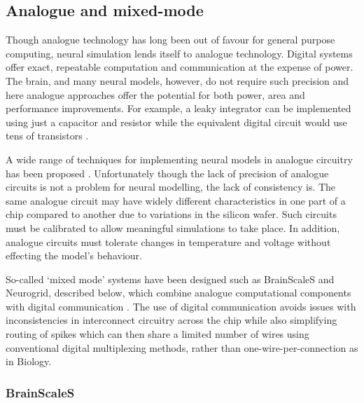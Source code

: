 		\subsection{Analogue and mixed-mode}
			
			Though analogue technology has long been out of favour for general purpose
			computing, neural simulation lends itself to analogue technology.  Digital
			systems offer exact, repeatable computation and communication at the
			expense of power. The brain, and many neural models, however, do not
			require such precision and here analogue approaches offer the potential
			for both power, area and performance improvements. For example, a leaky
			integrator can be implemented using just a capacitor and resistor while
			the equivalent digital circuit would use tens of transistors
			\cite{misra10}.
			
			A wide range of techniques for implementing neural models in analogue
			circuitry has been proposed \cite{graf86,holler89,agranat90,azghadi13}.
			Unfortunately though the lack of precision of analogue circuits is not a
			problem for neural modelling, the lack of consistency is. The same
			analogue circuit may have widely different characteristics in one part of
			a chip compared to another due to variations in the silicon wafer. Such
			circuits must be calibrated to allow meaningful simulations to take place.
			In addition, analogue circuits must tolerate changes in temperature and
			voltage without effecting the model's behaviour.
			
			So-called `mixed mode' systems have been designed such as BrainScaleS and
			Neurogrid, described below, which combine analogue computational
			components with digital communication \cite{maguire07,benjamin14}. The use
			of digital communication avoids issues with inconsistencies in
			interconnect circuitry across the chip while also simplifying routing of
			spikes which can then share a limited number of wires using conventional
			digital multiplexing methods, rather than one-wire-per-connection as in
			Biology.
			
			\subsubsection{BrainScaleS}
				
